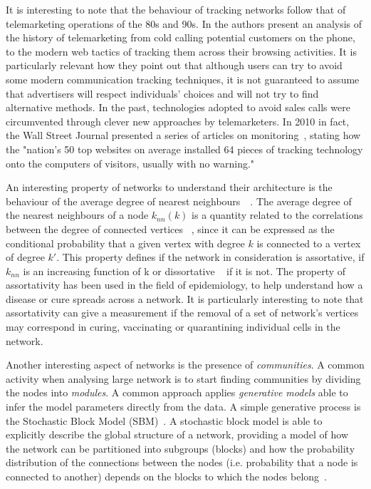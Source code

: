 It is interesting to note that the behaviour of tracking networks follow that of telemarketing operations of the 80s and 90s. In \cite{hoofnagle2012behavioral} the authors present an analysis of the history of telemarketing from cold calling potential customers on the phone, to the modern web tactics of tracking them across their browsing activities. It is particularly relevant how they point out that although users can try to avoid some modern communication tracking techniques, it is not guaranteed to assume that advertisers will respect individuals' choices and will not try to find alternative methods. In the past, technologies adopted to avoid sales calls were circumvented through clever new approaches by telemarketers. In 2010 in fact, the Wall Street Journal presented a series of articles on monitoring~\cite{angwin2010web}, stating how the "nation's 50 top websites on average installed 64 pieces of tracking technology onto the computers of visitors, usually with no warning."

An interesting property of networks to understand their architecture is the behaviour of the average degree of nearest neighbours~\cite{barrat2004architecture}~\cite{pastor2001dynamical}. The average degree of the nearest neighbours of a node $k_{nn}(k)$ is a quantity related to the correlations between the degree of connected vertices ~\cite{maslov2002specificity}, since it can be expressed as the conditional probability that a given vertex with degree $k$ is connected to a vertex of degree $k'$. This property defines if the network in consideration is assortative, if $k_{nn}$ is an increasing function of k or dissortative ~\cite{newman2002assortative} if it is not. The property of assortativity has been used  in the field of epidemiology, to help understand how a disease or cure spreads across a network. It is particularly interesting to note that assortativity can give a measurement if the removal of a set of network's vertices may correspond in curing, vaccinating or quarantining individual cells in the network. 

Another interesting aspect of networks is the presence of \emph{communities}. A common activity when analysing large network is to start finding communities by dividing the nodes into \emph{modules}. A common approach applies \emph{generative models} able to infer the model parameters directly from the data. A simple generative process is the Stochastic Block Model (SBM)~\cite{holland1983stochastic}. A stochastic block model is able to explicitly describe the global structure of a network, providing a model of how the network can be partitioned into subgroups (blocks) and how the probability distribution of the connections between the nodes (i.e. probability that a node is connected to another) depends on the blocks to which the nodes belong~\cite{faust1992blockmodels}.


